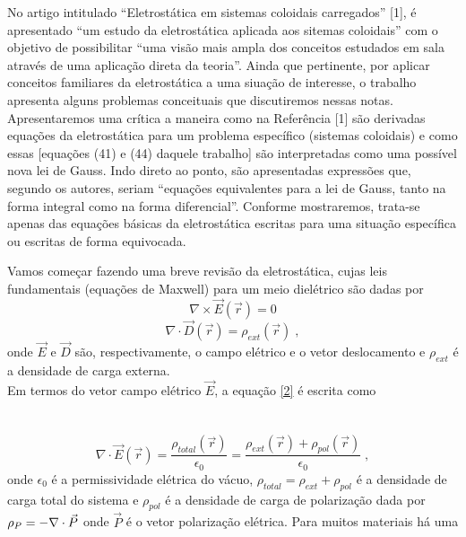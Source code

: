 \documentclass[brazilian,10.7pt,a4paper]{article}
\begin{document}
\begin{multicols}{2}
No artigo intitulado “Eletrostática em sistemas coloidais carregados” [1], é apresentado “um estudo da eletrostática aplicada aos sitemas coloidais” com o objetivo de possibilitar “uma visão mais ampla dos conceitos estudados em sala através de uma aplicação direta da teoria”. Ainda que pertinente, por aplicar conceitos familiares da eletrostática a uma siuação de interesse, o trabalho apresenta alguns problemas conceituais que discutiremos nessas notas. Apresentaremos uma crítica a maneira como na Referência [1] são derivadas equações
da eletrostática para um problema específico (sistemas coloidais) e como essas [equações (41) e (44) daquele trabalho] são interpretadas como uma possível nova lei de Gauss. Indo direto ao ponto, são apresentadas expressões que, segundo os autores, seriam “equações equivalentes para a lei de Gauss, tanto na forma integral como na forma diferencial”. Conforme mostraremos, trata-se apenas das equações básicas da eletrostática escritas para uma situação específica ou escritas de forma equivocada. \par
Vamos começar fazendo uma breve revisão da eletrostática, cujas leis fundamentais (equações de Maxwell)
para um meio dielétrico são dadas por \\
\begin{equation}\label{1}
\nabla\times\vec{E}(\vec{r}) = 0
\end{equation}
\vspace{1pt}
\begin{equation}\label{2}
\nabla\cdot\vec{D}(\vec{r}) = \rho_{ext}(\vec{r})\;, 
\end{equation}
\vspace{1pt}
onde $\vec{E}$ e $\vec{D}$ são, respectivamente, o campo elétrico e o vetor deslocamento e $\rho_{ext}$ é a densidade de carga externa. \\
Em termos do vetor campo elétrico $\vec{E}$, a equação \eqref{2} é escrita como \\
\\
\\
\begin{equation}\label{3}
\nabla\cdot\vec{E}(\vec{r})=\frac{\rho_{total}(\vec{r})}{\epsilon_{0}}=\frac{\rho_{ext}(\vec{r})+\rho_{pol}(\vec{r})}{\epsilon_{0}}\;,
\end{equation}
onde $\epsilon_{0}$ é a permissividade elétrica do vácuo, $\rho_{total} = \rho_{ext} + \rho_{pol}$ é a densidade de carga total do sistema e $\rho_{pol}$ é a densidade de carga de polarização dada por \;$\rho_{\large{P}} = -\nabla\cdot\vec{P}$ onde $\vec{P}$ é o vetor polarização elétrica. Para muitos materiais há uma

\end{multicols}
\end{document}
